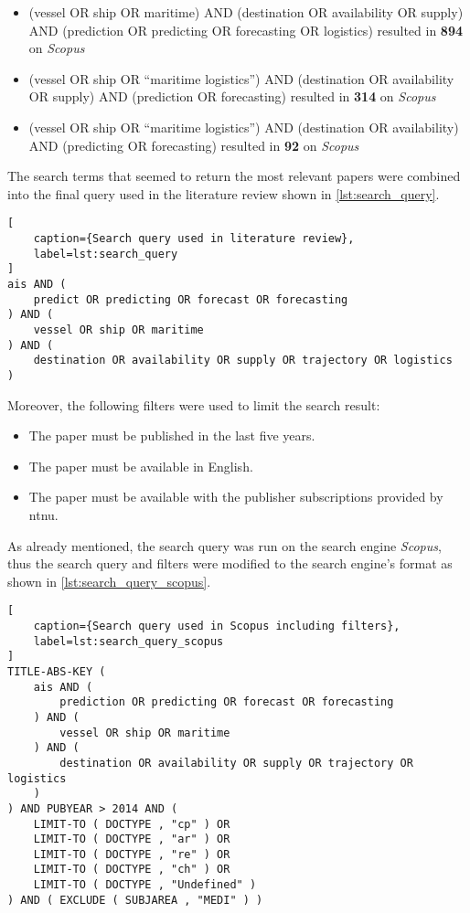 \begin{itemize}
    \item (vessel OR ship OR maritime) AND (destination OR availability OR supply) AND (prediction OR predicting OR forecasting OR logistics) resulted in \textbf{894} on \textit{Scopus}
    \item (vessel OR ship OR ``maritime logistics'') AND (destination OR availability OR supply) AND (prediction OR forecasting) resulted in \textbf{314} on \textit{Scopus}
    \item (vessel OR ship OR ``maritime logistics'') AND (destination OR availability) AND (predicting OR forecasting) resulted in \textbf{92} on \textit{Scopus}
\end{itemize}

The search terms that seemed to return the most relevant papers were combined into the final query used in the literature review shown in \cref{lst:search_query}.

\begin{lstlisting}[
    caption={Search query used in literature review},
    label=lst:search_query
]
ais AND (
    predict OR predicting OR forecast OR forecasting
) AND (
    vessel OR ship OR maritime
) AND (
    destination OR availability OR supply OR trajectory OR logistics
)
\end{lstlisting}

Moreover, the following filters were used to limit the search result:

\begin{itemize}
    \item The paper must be published in the last five years.
    \item The paper must be available in English.
    \item The paper must be available with the publisher subscriptions provided by \acrshort{ntnu}.
\end{itemize}

As already mentioned, the search query was run on the search engine \textit{Scopus}, thus the search query and filters were modified to the search engine's format as shown in \cref{lst:search_query_scopus}.

\begin{lstlisting}[
    caption={Search query used in Scopus including filters},
    label=lst:search_query_scopus
]
TITLE-ABS-KEY (
    ais AND (
        prediction OR predicting OR forecast OR forecasting
    ) AND (
        vessel OR ship OR maritime
    ) AND (
        destination OR availability OR supply OR trajectory OR logistics
    )
) AND PUBYEAR > 2014 AND (
    LIMIT-TO ( DOCTYPE , "cp" ) OR
    LIMIT-TO ( DOCTYPE , "ar" ) OR
    LIMIT-TO ( DOCTYPE , "re" ) OR
    LIMIT-TO ( DOCTYPE , "ch" ) OR
    LIMIT-TO ( DOCTYPE , "Undefined" )
) AND ( EXCLUDE ( SUBJAREA , "MEDI" ) )
\end{lstlisting}


